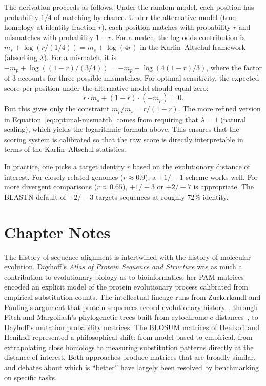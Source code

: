 The derivation proceeds as follows. Under the random model, each position has probability $1/4$ of matching by chance. Under the alternative model (true homology at identity fraction $r$), each position matches with probability $r$ and mismatches with probability $1-r$. For a match, the log-odds contribution is $m_s + \log(r / (1/4)) = m_s + \log(4r)$ in the Karlin--Altschul framework (absorbing $\lambda$). For a mismatch, it is $-m_p + \log((1-r)/(3/4)) = -m_p + \log(4(1-r)/3)$, where the factor of 3 accounts for three possible mismatches. For optimal sensitivity, the expected score per position under the alternative model should equal zero:
\begin{equation}
  \label{eq:mismatch-derivation}
  r \cdot m_s + (1-r) \cdot (-m_p) = 0.
\end{equation}
But this gives only the constraint $m_p / m_s = r/(1-r)$. The more refined version in Equation~\eqref{eq:optimal-mismatch} comes from requiring that $\lambda = 1$ (natural scaling), which yields the logarithmic formula above. This ensures that the scoring system is calibrated so that the raw score is directly interpretable in terms of the Karlin--Altschul statistics.

In practice, one picks a target identity $r$ based on the evolutionary distance of interest. For closely related genomes ($r \approx 0.9$), a $+1/-1$ scheme works well. For more divergent comparisons ($r \approx 0.65$), $+1/-3$ or $+2/-7$ is appropriate. The BLASTN default of $+2/-3$ targets sequences at roughly 72\% identity.


\section{Chapter Notes}
\label{sec:ch03-notes}

The history of sequence alignment is intertwined with the history of molecular evolution. Dayhoff's \textit{Atlas of Protein Sequence and Structure} \cite{dayhoff1978} was as much a contribution to evolutionary biology as to bioinformatics; her PAM matrices encoded an explicit model of the protein evolutionary process calibrated from empirical substitution counts. The intellectual lineage runs from Zuckerkandl and Pauling's argument that protein sequences record evolutionary history~\cite{zuckerkandl1965}, through Fitch and Margoliash's phylogenetic trees built from cytochrome $c$ distances~\cite{fitch1967}, to Dayhoff's mutation probability matrices. The BLOSUM matrices of Henikoff and Henikoff \cite{henikoff1992} represented a philosophical shift: from model-based to empirical, from extrapolating close homologs to measuring substitution patterns directly at the distance of interest. Both approaches produce matrices that are broadly similar, and debates about which is ``better'' have largely been resolved by benchmarking on specific tasks.

